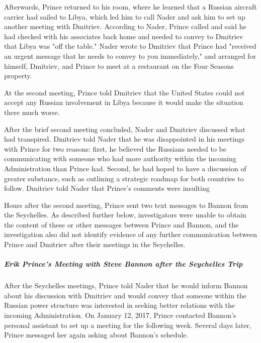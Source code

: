 Afterwards, Prince returned to his room, where he learned that a Russian aircraft carrier had sailed to Libya, which led him to call Nader and ask him to set up another meeting with Dmitriev.%
According to Nader, Prince called and said he had checked with his associates back home and needed to convey to Dmitriev that Libya was "off the table."%
Nader wrote to Dmitriev that Prince had "received an urgent message that he needs to convey to you immediately," and arranged for himself, Dmitriev, and Prince to meet at a restaurant on the Four Seasons property.%

At the second meeting, Prince told Dmitriev that the United States could not accept any Russian involvement in Libya because it would make the situation there much worse.%

After the brief second meeting concluded, Nader and Dmitriev discussed what had transpired.%
Dmitriev told Nader that he was disappointed in his meetings with Prince for two reasons: first, he believed the Russians needed to be communicating with someone who had more authority within the incoming Administration than Prince had.%
Second, he had hoped to have a discussion of greater substance, such as outlining a strategic roadmap for both countries to follow.%
Dmitriev told Nader that
Prince's comments
were insulting

Hours after the second meeting, Prince sent two text messages to Bannon from the Seychelles.%
As described further below, investigators were unable to obtain the content of these or other messages between Prince and Bannon, and the investigation also did not identify evidence of any further communication between Prince and Dmitriev after their meetings in the Seychelles.

\subparagraph{Erik Prince's Meeting with Steve Bannon after the Seychelles Trip}

After the Seychelles meetings, Prince told Nader that he would inform Bannon about his discussion with Dmitriev and would convey that someone within the Russian power structure was interested in seeking better relations with the incoming Administration.%
On January 12, 2017, Prince contacted Bannon's personal assistant to set up a meeting for the following week.%
Several days later, Prince messaged her again asking about Bannon's schedule.%

